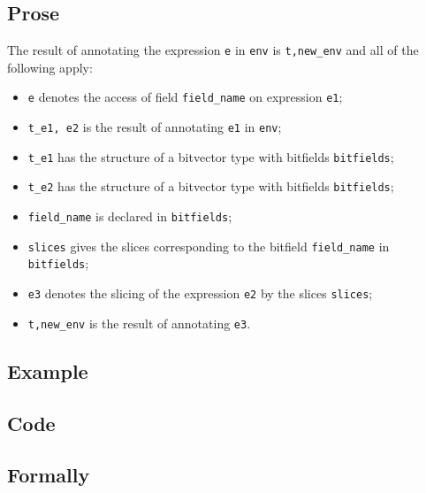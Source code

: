 \documentclass{book}
\begin{document}
  \subsection{Prose}
  The result of annotating the expression \texttt{e} in \texttt{env} is
\texttt{t,new\_env} and all of the following apply:
  \begin{itemize}
  \item \texttt{e} denotes the access of field \texttt{field\_name} on expression \texttt{e1};
  \item \texttt{t\_e1, e2} is the result of annotating \texttt{e1} in \texttt{env};
  \item \texttt{t\_e1} has the structure of a bitvector type with bitfields \texttt{bitfields};
  \item \texttt{t\_e2} has the structure of a bitvector type with bitfields \texttt{bitfields};
  \item \texttt{field\_name} is declared in \texttt{bitfields};
  \item \texttt{slices} gives the slices corresponding to the bitfield \texttt{field\_name}
    in \texttt{bitfields};
  \item \texttt{e3} denotes the slicing of the expression \texttt{e2} by the slices \texttt{slices};
  \item \texttt{t,new\_env} is the result of annotating \texttt{e3}.
  \end{itemize}

  \subsection{Example}

  \subsection{Code}

\begin{emptyformal}
    \subsection{Formally}
\end{emptyformal}

\end{document}
